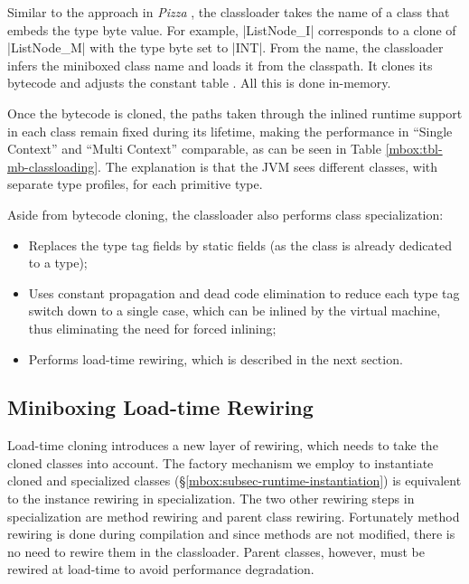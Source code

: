  Similar to the approach in {\em Pizza} \cite{pizza}, the classloader takes the name of a class that embeds the type byte value. For example, |ListNode_I| corresponds to a clone of |ListNode_M| with the type byte set to |INT|. From the name, the classloader infers the miniboxed class name and loads it from the classpath. It clones its bytecode and adjusts the constant table \cite{jsr-202}. All this is done in-memory. 

Once the bytecode is cloned, the paths taken through the inlined runtime support in each class remain fixed during its lifetime, making the performance in ``Single Context'' and ``Multi Context'' comparable, as can be seen in Table \ref{mbox:tbl-mb-classloading}. The explanation is that the JVM sees different classes, with separate type profiles, for each primitive type.  

Aside from bytecode cloning, the classloader also performs class specialization:
\begin{itemize}
\item Replaces the type tag fields by static fields (as the class is already dedicated to a type);
\item Uses constant propagation and dead code elimination to reduce each type tag switch down to a single case, which can be inlined by the virtual machine, thus eliminating the need for forced inlining;
\item Performs load-time rewiring, which is described in the next section. 
\end{itemize} 

\subsection{Miniboxing Load-time Rewiring}
\label{mbox:subsec-runtime-rewiring}

 Load-time cloning introduces a new layer of rewiring, which needs to take the cloned classes into account. The factory mechanism we employ to instantiate cloned and specialized classes (\S\ref{mbox:subsec-runtime-instantiation}) is equivalent to the instance rewiring in specialization. The two other rewiring steps in specialization are method rewiring and parent class rewiring. Fortunately method rewiring is done during compilation and since methods are not modified, there is no need to rewire them in the classloader. Parent classes, however, must be rewired at load-time to avoid performance degradation.  

